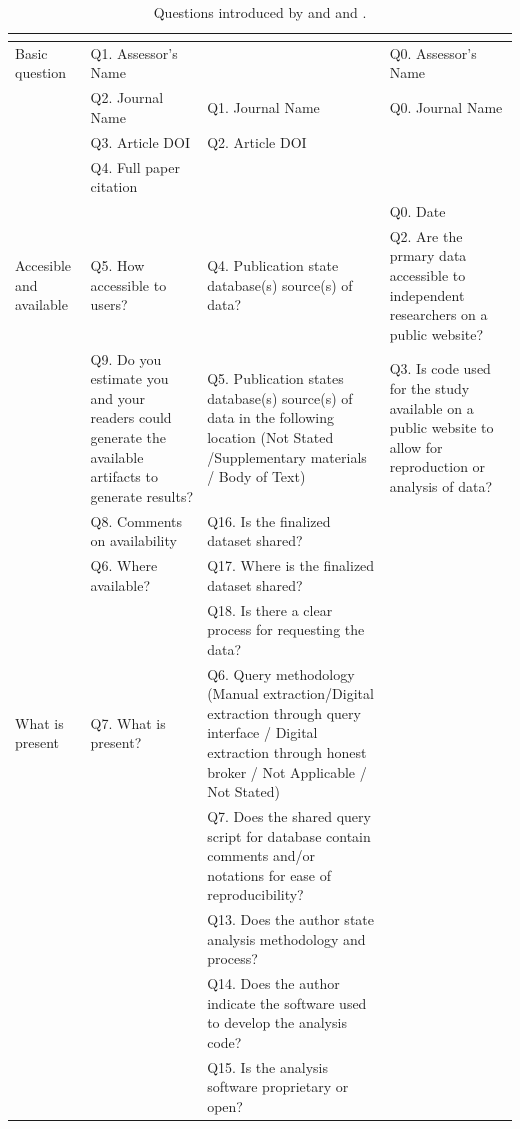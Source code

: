 \documentclass[12pt, a4paper, twocolumn]{article}
\begin{document}
	\begin{table}[]
	\centering
	\caption[]{Questions introduced by \citet{stagge2019assessing} and  \citet{mcintosh2017repeat} and \citet{QualityOutputChecklist}. }\label{tab:survey_table_2}
	\begin{tabular}{>{\raggedright\arraybackslash}p{}>{\raggedright\arraybackslash}p{} >{\raggedright\arraybackslash}p{}>{\raggedright\arraybackslash}p{}}  
	\hline
	&\citet{stagge2019assessing}         & \citet{mcintosh2017repeat}   &\citet{QualityOutputChecklist} \\                     
        \hline
	Basic question                &Q1. Assessor's Name             &                                                        &Q0. Assessor's Name                        \\
	&Q2. Journal Name                                                    & Q1. Journal Name                                &Q0. Journal Name                        \\
	&Q3. Article DOI                                                       &  Q2. Article DOI                                 &                     \\
	&Q4. Full paper citation                              &          & \\               
	&			&              & Q0. Date            	                     \\  
      \hline
	Accesible and available &Q5. How accessible to users?   &Q4. Publication state database(s) source(s) of data?       & Q2. Are the prmary data accessible to independent researchers on a public website?  \\
	 &Q9. Do you estimate you and your readers could generate the available artifacts to generate results?     &Q5. Publication states database(s) source(s) of data in the following location (Not Stated /Supplementary materials / Body of Text)          &Q3. Is code used for the study available on a public website to allow for reproduction or analysis of data?                                  \\
&Q8. Comments on availability  &Q16. Is the finalized dataset shared?   & \\
&Q6. Where available?&Q17. Where is the finalized dataset shared?      & \\
&& Q18. Is there a clear process for requesting the data?  & \\
	\hline
What is present &Q7. What is present?          &Q6. Query methodology (Manual extraction/Digital extraction through query interface / Digital extraction through honest broker / Not Applicable / Not Stated)  &\\
&&Q7. Does the shared query script for database contain comments and/or notations for ease of reproducibility?&\\
&& Q13. Does the author state analysis methodology and process?                                 & \\
&& Q14. Does the author indicate the software used to develop the analysis code? & \\
&& Q15. Is the analysis software proprietary or open? & \\ 


\end{tabular}
\end{table}
\end{document}
